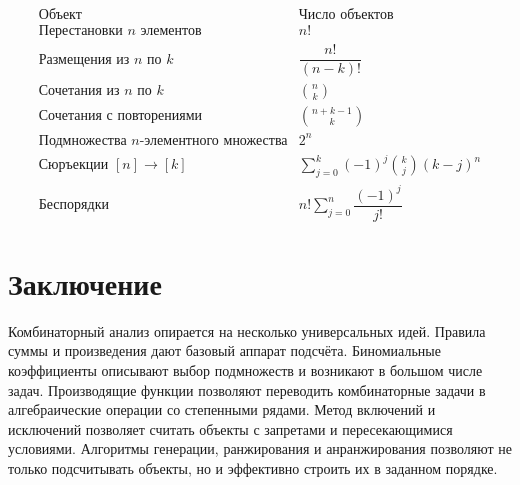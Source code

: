 \documentclass[12pt,a4paper]{article}
\begin{document}
\[
\begin{array}{c|c}
\text{Объект} & \text{Число объектов}\\
\hline
\text{Перестановки } n \text{ элементов} & n!\\
\text{Размещения из } n \text{ по } k & \dfrac{n!}{(n-k)!}\\
\text{Сочетания из } n \text{ по } k & \binom{n}{k}\\
\text{Сочетания с повторениями} & \binom{n+k-1}{k}\\
\text{Подмножества } n\text{-элементного множества} & 2^n\\
\text{Сюръекции } [n]\to[k] &
\sum_{j=0}^k(-1)^j\binom{k}{j}(k-j)^n\\
\text{Беспорядки} &
n!\sum_{j=0}^n\dfrac{(-1)^j}{j!}
\end{array}
\]

\section{Заключение}

Комбинаторный анализ опирается на несколько универсальных идей. Правила суммы и произведения дают базовый аппарат подсчёта. Биномиальные коэффициенты описывают выбор подмножеств и возникают в большом числе задач. Производящие функции позволяют переводить комбинаторные задачи в алгебраические операции со степенными рядами. Метод включений и исключений позволяет считать объекты с запретами и пересекающимися условиями. Алгоритмы генерации, ранжирования и анранжирования позволяют не только подсчитывать объекты, но и эффективно строить их в заданном порядке.
\end{document}
